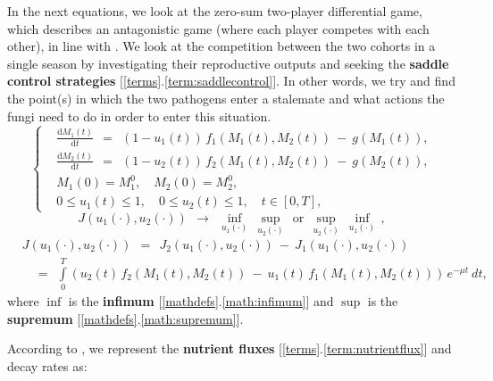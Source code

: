 \documentclass[11pt]{amsart}
\begin{document}
In the next equations, we look at the zero-sum two-player differential game, which describes an antagonistic game (where each player competes with each other), in line with \cite{YegorovGrognardMailleretHalkettBernhard2019,
BernhardGrognardMailleretAkhmetzhanov2010}.
We look at the competition between the two cohorts in a single season by investigating their reproductive outputs and seeking the \textbf{saddle control strategies} [\ref{terms}.\ref{term:saddlecontrol}]. In other words, we try and find the point(s) in which the two pathogens enter a stalemate and what actions the fungi need to do in order to enter this situation.
\begin{equation}
\left\{ \begin{aligned}
& \frac{\mathrm{d} M_1(t)}{\mathrm{d} t} \:\: = \:\: \left(1 - u_1(t)\right) \,
  f_1\left(M_1(t), M_2(t)\right) \: - \: g\left(M_1(t)\right), \\
& \frac{\mathrm{d} M_2(t)}{\mathrm{d} t} \:\: = \:\: \left(1 - u_2(t)\right) \,
  f_2\left(M_1(t), M_2(t)\right) \: - \: g\left(M_2(t)\right), \\
& M_1(0) = M_1^0, \quad M_2(0) = M_2^0, \\
& 0 \leqslant u_1(t) \leqslant 1, \quad 0 \leqslant u_2(t) \leqslant 1,
  \quad t \in [0, T],
\end{aligned} \right.  \label{7}
\end{equation}
\begin{equation}
J(u_1(\cdot), u_2(\cdot)) \:\: \longrightarrow \:\: 
\inf_{u_1(\cdot)} \:  \sup_{u_2(\cdot)} 
\:\: \mbox{or} \:\:
\sup_{u_2(\cdot)} \: \inf_{u_1(\cdot)} \, ,  \label{8}
\end{equation}
\begin{equation}
\begin{aligned}
& J\left(u_1(\cdot), u_2(\cdot)\right) \:\: = \:\: J_2\left(u_1(\cdot), u_2(\cdot)\right) \: - \:
J_1\left(u_1(\cdot), u_2(\cdot)\right) \\
& \quad
= \:\: \int\limits_0^T \left( u_2(t) \, f_2(M_1(t), M_2(t)) \: - \: u_1(t)
  \, f_1(M_1(t), M_2(t)) \right) \,
e^{-\mu t} \: dt,
\end{aligned}  \label{9}
\end{equation}
where $\inf$ is the \textbf{infimum} [\ref{mathdefs}.\ref{math:infimum}] and $\sup$ is the \textbf{supremum} [\ref{mathdefs}.\ref{math:supremum}].


According to \cite{YegorovGrognardMailleretHalkettBernhard2019}, we represent
the \textbf{nutrient fluxes} [\ref{terms}.\ref{term:nutrientflux}] and decay rates as:
\end{document}
